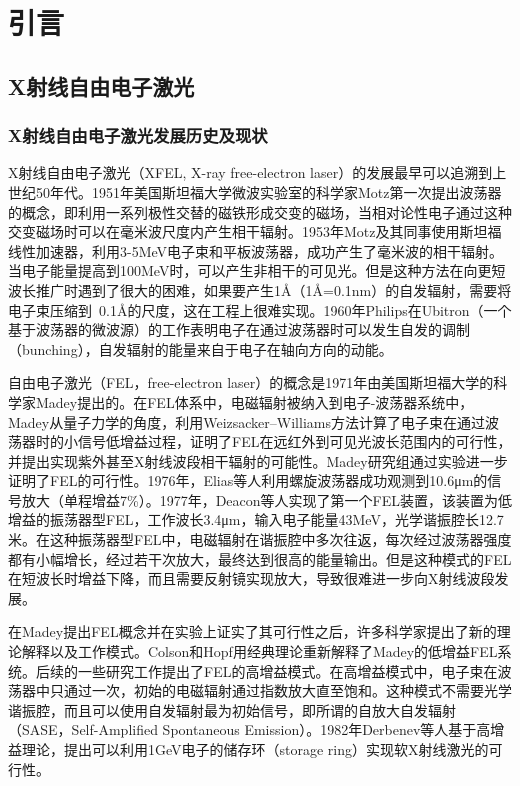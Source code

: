 \chapter{引言}

\section{X射线自由电子激光}
\subsection{X射线自由电子激光发展历史及现状}

X射线自由电子激光（XFEL, X-ray free-electron laser）的发展最早可以追溯到上世纪50年代。1951年美国斯坦福大学微波实验室的科学家Motz第一次提出波荡器的概念，即利用一系列极性交替的磁铁形成交变的磁场，当相对论性电子通过这种交变磁场时可以在毫米波尺度内产生相干辐射\cite{motz1951applications}。1953年Motz及其同事使用斯坦福线性加速器，利用3-5MeV电子束和平板波荡器，成功产生了毫米波的相干辐射。当电子能量提高到100MeV时，可以产生非相干的可见光\cite{motz1953experiments}。但是这种方法在向更短波长推广时遇到了很大的困难，如果要产生1Å（1Å=0.1nm）的自发辐射，需要将电子束压缩到~0.1Å的尺度，这在工程上很难实现。1960年Philips在Ubitron（一个基于波荡器的微波源）的工作表明电子在通过波荡器时可以发生自发的调制（bunching），自发辐射的能量来自于电子在轴向方向的动能\cite{phillips1988history}。

自由电子激光（FEL，free-electron laser）的概念是1971年由美国斯坦福大学的科学家Madey提出的。在FEL体系中，电磁辐射被纳入到电子-波荡器系统中，Madey从量子力学的角度，利用Weizsacker–Williams方法计算了电子束在通过波荡器时的小信号低增益过程，证明了FEL在远红外到可见光波长范围内的可行性，并提出实现紫外甚至X射线波段相干辐射的可能性\cite{madey1971stimulated}。Madey研究组通过实验进一步证明了FEL的可行性。1976年，Elias等人利用螺旋波荡器成功观测到10.6μm的信号放大（单程增益7\%）。1977年，Deacon等人实现了第一个FEL装置，该装置为低增益的振荡器型FEL，工作波长3.4μm，输入电子能量43MeV，光学谐振腔长12.7米\cite{deacon1977first}。在这种振荡器型FEL中，电磁辐射在谐振腔中多次往返，每次经过波荡器强度都有小幅增长，经过若干次放大，最终达到很高的能量输出。但是这种模式的FEL在短波长时增益下降，而且需要反射镜实现放大，导致很难进一步向X射线波段发展。

在Madey提出FEL概念并在实验上证实了其可行性之后，许多科学家提出了新的理论解释以及工作模式。Colson\cite{colson1977one}和Hopf\cite{hopf1976classical}用经典理论重新解释了Madey的低增益FEL系统。后续的一些研究工作提出了FEL的高增益模式。在高增益模式中，电子束在波荡器中只通过一次，初始的电磁辐射通过指数放大直至饱和。这种模式不需要光学谐振腔，而且可以使用自发辐射最为初始信号，即所谓的自放大自发辐射（SASE，Self-Amplified Spontaneous Emission）。1982年Derbenev等人基于高增益理论，提出可以利用1GeV电子的储存环（storage ring）实现软X射线激光的可行性\cite{derbenev1982possibility}。


